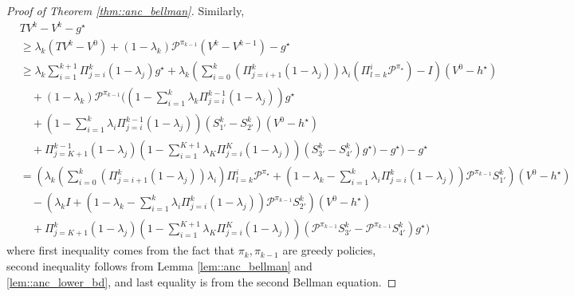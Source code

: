 \documentclass{article} %
\newcommand{\cP}{\mathcal{P}}
\newcommand*{\para}[1]{\left({#1}\right)}
\begin{document}
\begin{proof}[Proof of Theorem \ref{thm::anc_bellman}]
Similarly,  
    \begin{align*}
        &TV^k-V^k-g^{\star} 
        \\& \ge \lambda_k (TV^k-V^0)+(1-\lambda_k)\cP^{\pi_{k-1}}(V^k- V^{k-1})-g^{\star}
        \\& \ge \lambda_k\sum_{i=1}^{k+1} \Pi^{k}_{j=i} (1-\lambda_j)g^{\star} +\lambda_k\para{\sum_{i=0}^{k} (\Pi^k_{j=i+1} (1-\lambda_j)) \lambda_{i}\para{\Pi^{i}_{l=k}\cP^{\pi_\star}}-I}(V^0-h^{\star})
        \\& \quad + (1-\lambda_k)\cP^{\pi_{k-1}}\Bigg(\para{1-\sum_{i=1}^{k} \lambda_k \Pi^{k-1}_{j=i} (1-\lambda_j)}g^{\star} 
        \\& \quad + \para{1-\sum_{i=1}^{k} \lambda_i \Pi^{k-1}_{j=i} (1-\lambda_j)}(S^{k}_{1'} -S^{k}_{2'})(V^0-h^{\star})
        \\& \quad + \Pi^{k-1}_{j=K+1} (1-\lambda_j)\para{1-\sum_{i=1}^{K+1} \lambda_{K} \Pi^{K}_{j=i} (1-\lambda_j)}(S^{k}_{3'}-S^{k}_{4'})g^{\star}\Bigg)-g^{\star}\Bigg)-g^{\star}
        \end{align*}
        \begin{align*}
            & = \para{\lambda_k\para{\sum_{i=0}^{k} (\Pi^k_{j=i+1} (1-\lambda_j)) \lambda_{i}}\Pi^{i}_{l=k}\cP^{\pi_\star}+\para{1-\lambda_k-\sum_{i=1}^{k} \lambda_i \Pi^{k}_{j=i} (1-\lambda_j)}\cP^{\pi_{k-1}}S^{k}_{1'}}(V^0-h^{\star})
        \\& \quad -  \para{\lambda_k I+\para{1-\lambda_k-\sum_{i=1}^{k} \lambda_i \Pi^{k}_{j=i} (1-\lambda_j)}\cP^{\pi_{k-1}}S^{k}_{2'}}(V^0-h^{\star})
        \\& \quad +\Pi^{k}_{j=K+1} (1-\lambda_j)\para{1-\sum_{i=1}^{K+1} \lambda_{K} \Pi^{K}_{j=i} (1-\lambda_j)}(\cP^{\pi_{k-1}}S^{k}_{3'}-\cP^{\pi_{k-1}}S^{k}_{4'})g^{\star}\Bigg)
    \end{align*}
    where first inequality comes from the fact that $\pi_k, \pi_{k-1}$ are greedy policies, second inequality follows from Lemma \ref{lem::anc_bellman} and  \ref{lem::anc_lower_bd}, and last equality is from the second Bellman equation. 

\end{proof}
\end{document}

